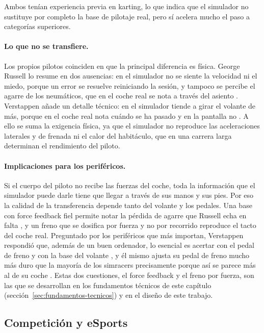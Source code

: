 Ambos tenían experiencia previa en karting, lo que indica que el simulador no sustituye por completo la base de pilotaje real, pero sí acelera mucho el paso a categorías superiores.

\paragraph{Lo que no se transfiere.}
Los propios pilotos coinciden en que la principal diferencia es física. George Russell lo resume en dos ausencias: en el simulador no se siente la velocidad ni el miedo, porque un error se resuelve reiniciando la sesión, y tampoco se percibe el agarre de los neumáticos, que en el coche real se nota a
través del asiento \parencite{planetf1_russell_sim}. Verstappen añade un detalle técnico: en el simulador tiende a girar el volante de más, porque en el coche real nota cuándo se ha pasado y en la pantalla no \parencite{gpblog_verstappen_sim}. A ello se suma la exigencia física, ya que el simulador no reproduce las aceleraciones laterales y de frenada ni el calor del habitáculo, que en una carrera larga determinan el
rendimiento del piloto.

\paragraph{Implicaciones para los periféricos.}
Si el cuerpo del piloto no recibe las fuerzas del coche, toda la información que el simulador puede darle tiene que llegar a través de sus manos y sus pies. Por eso la calidad de la transferencia depende tanto del volante y los pedales. Una base con force feedback fiel permite notar la pérdida de
agarre que Russell echa en falta \parencite{toffin_2007_steering_feedback, murphy_2025_ffb_simracing}, y un freno que se dosifica por fuerza y no por recorrido reproduce el tacto del coche real. Preguntado por los periféricos que más importan, Verstappen respondió que, además de un buen ordenador, lo esencial es acertar con el pedal de freno y con la base del volante \parencite{caranddriver_verstappen_sim}, y él mismo ajusta su pedal de freno mucho más duro que la mayoría de los simracers precisamente porque así se parece más al de su coche \parencite{gpblog_verstappen_sim}. Estas dos
cuestiones, el force feedback y el freno por fuerza, son las que se desarrollan en los fundamentos técnicos de este capítulo (sección~\ref{sec:fundamentos-tecnicos}) y en el diseño de este trabajo.


\subsection{Competición y eSports}
\label{sec:simracing-esports}

